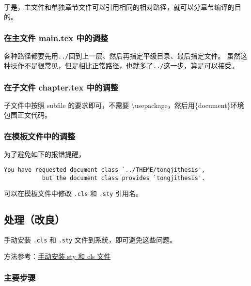 \documentclass[../Main/thesis.tex]{subfiles}
\begin{document}
于是，主文件和单独章节文件可以引用相同的相对路径，就可以分章节编译的目的。

\subsubsection{在主文件 main.tex
中的调整}

各种路径都要先用\texttt{../}回到上一层、然后再指定平级目录、最后指定文件。
虽然这种操作不是很常见，但是相比正常路径，也就多了\texttt{../}这一步，算是可以接受。


\subsubsection{在子文件 chapter.tex
中的调整}

子文件中按照 subfile 的要求即可，不需要
\textbackslash usepackage，然后用\{document\}环境包围正文代码。


\subsubsection{在模板文件中的调整}

为了避免如下的报错提醒，

\begin{verbatim}
You have requested document class `../THEME/tongjithesis',
           but the document class provides `tongjithesis'.
\end{verbatim}

可以在模板文件中修改 \texttt{.cls} 和 \texttt{.sty} 引用名。


\subsection{处理（改良）}

手动安装 \texttt{.cls} 和 \texttt{.sty} 文件到系统，即可避免这些问题。

方法参考：\href{https://zhuanlan.zhihu.com/p/113124407}{手动安装 sty 和
cls 文件}

\subsubsection{主要步骤}
\end{document}
